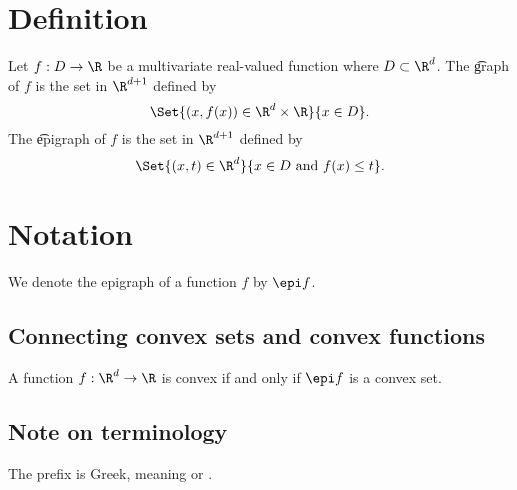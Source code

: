 

\section*{Definition}

Let $f: D \to \R $ be a multivariate real-valued function where $D \subset \R ^d$.
The \t{graph} of $f$ is the set in $\R ^{d + 1}$ defined by
    \[
\Set{(x, f(x)) \in \R ^d \times  \R }{x \in D}.
    \]
The \t{epigraph} of $f$ is the set in $\R ^{d + 1}$ defined by
    \[
\Set{(x, t) \in \R ^{d}}{x \in D \text{ and } f(x) \leq t}.
    \]

\section*{Notation}

We denote the epigraph of a function $f$ by $\epi f$.



\subsection*{Connecting convex sets and convex functions}

A function $f: \R ^d \to \R $ is convex if and only if $\epi f$ is a convex set.
\subsection*{Note on terminology}

The prefix  is Greek, meaning  or .

\blankpage